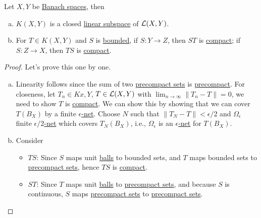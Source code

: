 \begin{proposition}\label{prop:lec17}
	Let \(X, Y\) be \hyperref[def:Banach-space]{Banach spaces}, then
	\begin{enumerate}[(a)]
		\item \(K(X, Y)\) is a closed \hyperref[def:linear-vector-space]{linear subspace} of \(\mathcal{\MakeUppercase{l}} (X, Y)\).
		\item For \(T\in K(X, Y)\) and \(S\) is \hyperref[def:bounded-map]{bounded}, if \(S\colon Y\to Z\), then \(ST\) is \hyperref[def:compact-op]{compact}; if \(S\colon Z\to X\), then \(TS\) is \hyperref[def:compact-op]{compact}.
	\end{enumerate}
\end{proposition}
\begin{proof}
	Let's prove this one by one.
	\begin{enumerate}[(a)]
		\item Linearity follows since the sum of two \hyperref[def:precompact]{precompact sets} is \hyperref[def:precompact]{precompact}. For closeness, let \(T_n\in Kx, Y\), \(T\in \mathcal{\MakeUppercase{l}} (X, Y)\) with \(\lim_{n \to \infty} \left\lVert T_n - T\right\rVert = 0\), we need to show \(T\) is \hyperref[def:compact-op]{compact}. We can show this by showing that we can cover \(T(B_X)\) by a finite \hyperref[def:eps-net]{\(\epsilon \)-net}. Choose \(N\) such that \(\left\lVert T_N - T\right\rVert < \epsilon / 2\) and \(\Omega _\epsilon \) finite \hyperref[def:eps-net]{\(\epsilon /2\)-net} which covers \(T_N(B_X)\), i.e., \(\Omega _\epsilon \) is an \hyperref[def:eps-net]{\(\epsilon \)-net} for \(T(B_X)\).
		\item Consider
		      \begin{itemize}
			      \item \(TS\): Since \(S\) maps unit \hyperref[def:ball]{balls} to bounded sets, and \(T\) maps bounded sets to \hyperref[def:precompact]{precompact sets}, hence \(TS\) is \hyperref[def:compact-op]{compact}.
			      \item \(ST\): Since \(T\) maps unit \hyperref[def:ball]{balls} to \hyperref[def:precompact]{precompact sets}, and because \(S\) is continuous, \(S\) maps \hyperref[def:precompact]{precompact sets} to \hyperref[def:precompact]{precompact sets}.
		      \end{itemize}
	\end{enumerate}
\end{proof}